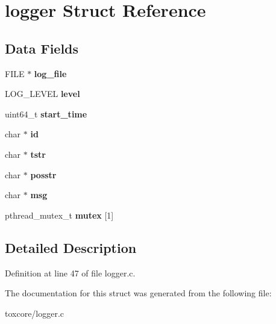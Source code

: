 \hypertarget{structlogger}{\section{logger Struct Reference}
\label{structlogger}
}
\subsection*{Data Fields}
\begin{DoxyCompactItemize}
\item 
\hypertarget{structlogger_ab936051f5aaca44c6c3c41dee0d19c36}{F\+I\+L\+E $\ast$ {\bfseries log\+\_\+file}}\label{structlogger_ab936051f5aaca44c6c3c41dee0d19c36}

\item 
\hypertarget{structlogger_a77f7159081bd39a76d8b86af56256201}{L\+O\+G\+\_\+\+L\+E\+V\+E\+L {\bfseries level}}\label{structlogger_a77f7159081bd39a76d8b86af56256201}

\item 
\hypertarget{structlogger_a5b11efea935978e9f1913e964a5e5396}{uint64\+\_\+t {\bfseries start\+\_\+time}}\label{structlogger_a5b11efea935978e9f1913e964a5e5396}

\item 
\hypertarget{structlogger_aecb3b0d045ada529257a2fbf8f829599}{char $\ast$ {\bfseries id}}\label{structlogger_aecb3b0d045ada529257a2fbf8f829599}

\item 
\hypertarget{structlogger_a756188d61db4922010ba1bf67c2f381e}{char $\ast$ {\bfseries tstr}}\label{structlogger_a756188d61db4922010ba1bf67c2f381e}

\item 
\hypertarget{structlogger_a56126aabcbc86b3b9b826e08036685eb}{char $\ast$ {\bfseries posstr}}\label{structlogger_a56126aabcbc86b3b9b826e08036685eb}

\item 
\hypertarget{structlogger_a32d2f5216cddb59c7cc8fb2806a7e727}{char $\ast$ {\bfseries msg}}\label{structlogger_a32d2f5216cddb59c7cc8fb2806a7e727}

\item 
\hypertarget{structlogger_ab4293016252c4d4e63549b0773fa0f33}{pthread\+\_\+mutex\+\_\+t {\bfseries mutex} \mbox{[}1\mbox{]}}\label{structlogger_ab4293016252c4d4e63549b0773fa0f33}

\end{DoxyCompactItemize}


\subsection{Detailed Description}


Definition at line 47 of file logger.\+c.



The documentation for this struct was generated from the following file\+:\begin{DoxyCompactItemize}
\item 
toxcore/logger.\+c\end{DoxyCompactItemize}
